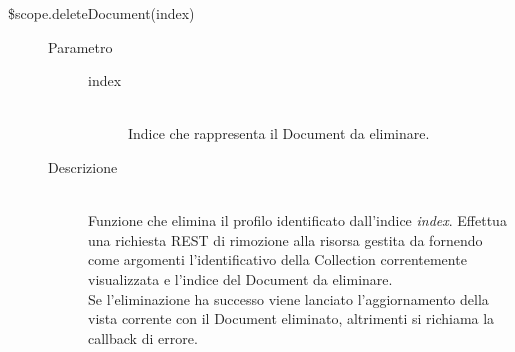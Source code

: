\begin{description}
\begin{description}
  
  \item[\$scope.deleteDocument(index)] \hfill
  \begin{description}
  	\item[Parametro] \hfill
  		\begin{description}
  			\item[index] \hfill \\
  			Indice che rappresenta il Document da eliminare.
       \end{description}
  	\item[Descrizione] \hfill \\
      Funzione che elimina il profilo identificato dall'indice \textit{index}. Effettua una richiesta REST di rimozione alla risorsa gestita da  fornendo come argomenti l'identificativo della Collection correntemente visualizzata e l'indice del Document da eliminare. \\
  Se l'eliminazione ha successo viene lanciato l'aggiornamento della vista corrente con il Document eliminato, altrimenti si richiama la callback di errore.
    \end{description}
  
  
 \end{description}
\end{description}

